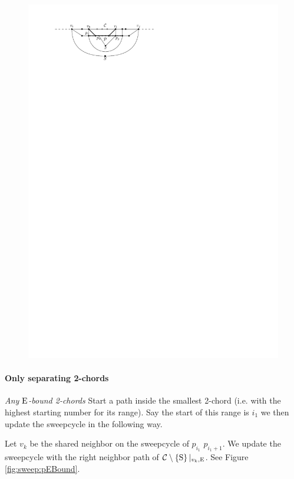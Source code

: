     \begin{figure}[h]
      \centering
      \includegraphics[scale=1]{unifiedAlgo/img/sweep/2chordInChordUpdate}
      \caption{}
      \label{fig:sweep:2chordInChordUpdate}
    \end{figure}

    \paragraph{Only separating 2-chords}
    \emph{Any $\mathrm{E}$-bound 2-chords}
    Start a path inside the smallest 2-chord (i.e. with the highest starting number for its range). Say the start of this range is $i_1$ we then update the sweepcycle in the following way.

    Let $v_k$ be the shared neighbor on the sweepcycle of $p_{i_1}$ $p_{i_1 +1}$. We update the sweepcycle with the right neighbor path of $\mathcal{C} \setminus \left\lbrace {\mathrm{S}} \right\rbrace|_{v_k, \mathrm{E}}$. See Figure \ref{fig:sweep:pEBound}.


